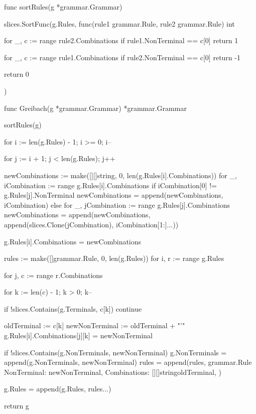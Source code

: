 func sortRules(g *grammar.Grammar) {
	slices.SortFunc(g.Rules, func(rule1 grammar.Rule, rule2 grammar.Rule) int {
		for _, c := range rule2.Combinations {
			if rule1.NonTerminal == c[0] {
				return 1
			}
		}

		for _, c := range rule1.Combinations {
			if rule2.NonTerminal == c[0] {
				return -1
			}
		}

		return 0
	})
}

func Greibach(g *grammar.Grammar) *grammar.Grammar {
	sortRules(g)

	for i := len(g.Rules) - 1; i >= 0; i-- {
		for j := i + 1; j < len(g.Rules); j++ {
			newCombinations := make([][]string, 0, len(g.Rules[i].Combinations))
			for _, iCombination := range g.Rules[i].Combinations {
				if iCombination[0] != g.Rules[j].NonTerminal {
					newCombinations = append(newCombinations, iCombination)
				} else {
					for _, jCombination := range g.Rules[j].Combinations {
						newCombinations = append(newCombinations, append(slices.Clone(jCombination), iCombination[1:]...))
					}
				}
			}

			g.Rules[i].Combinations = newCombinations
		}
	}

	rules := make([]grammar.Rule, 0, len(g.Rules))
	for i, r := range g.Rules {
		for j, c := range r.Combinations {
			for k := len(c) - 1; k > 0; k-- {
				if !slices.Contains(g.Terminals, c[k]) {
					continue
				}

				oldTerminal := c[k]
				newNonTerminal := oldTerminal + "'"
				g.Rules[i].Combinations[j][k] = newNonTerminal

				if !slices.Contains(g.NonTerminals, newNonTerminal) {
					g.NonTerminals = append(g.NonTerminals, newNonTerminal)
					rules = append(rules, grammar.Rule{
						NonTerminal:  newNonTerminal,
						Combinations: [][]string{{oldTerminal}},
					})
				}
			}
		}
	}

	g.Rules = append(g.Rules, rules...)

	return g
}